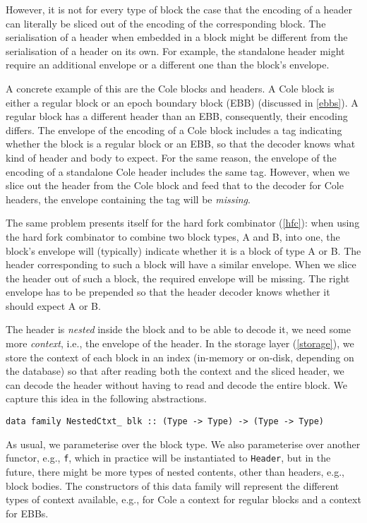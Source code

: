 However, it is not for every type of block the case that the encoding of a
header can literally be sliced out of the encoding of the corresponding block.
The serialisation of a header when embedded in a block might be different from
the serialisation of a header on its own. For example, the standalone header
might require an additional envelope or a different one than the block's
envelope.

A concrete example of this are the Cole blocks and headers. A Cole block is
either a regular block or an epoch boundary block (EBB) (discussed in
\cref{ebbs}). A regular block has a different header than an EBB, consequently,
their encoding differs. The envelope of the encoding of a Cole block includes a
tag indicating whether the block is a regular block or an EBB, so that the
decoder knows what kind of header and body to expect. For the same reason, the
envelope of the encoding of a standalone Cole header includes the same tag.
However, when we slice out the header from the Cole block and feed that to the
decoder for Cole headers, the envelope containing the tag will be
\emph{missing}.

The same problem presents itself for the hard fork combinator (\cref{hfc}): when
using the hard fork combinator to combine two block types, A and B, into one,
the block's envelope will (typically) indicate whether it is a block of type A
or B. The header corresponding to such a block will have a similar envelope.
When we slice the header out of such a block, the required envelope will be
missing. The right envelope has to be prepended so that the header decoder knows
whether it should expect A or B.

The header is \emph{nested} inside the block and to be able to decode it, we
need some more \emph{context}, i.e., the envelope of the header. In the storage
layer (\cref{storage}), we store the context of each block in an index
(in-memory or on-disk, depending on the database) so that after reading both the
context and the sliced header, we can decode the header without having to read
and decode the entire block. We capture this idea in the following abstractions.

\begin{lstlisting}
data family NestedCtxt_ blk :: (Type -> Type) -> (Type -> Type)
\end{lstlisting}
As usual, we parameterise over the block type. We also parameterise over another
functor, e.g., \lstinline!f!, which in practice will be instantiated to
\lstinline!Header!, but in the future, there might be more types of nested
contents, other than headers, e.g., block bodies. The constructors of this data
family will represent the different types of context available, e.g., for Cole
a context for regular blocks and a context for EBBs.

